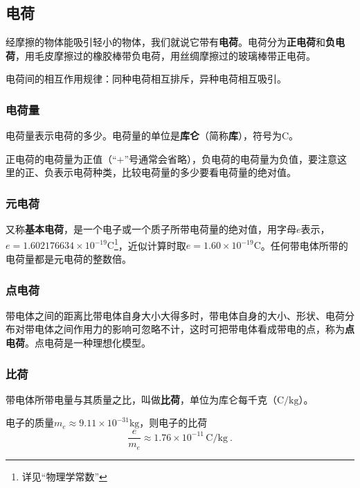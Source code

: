 
\subsection{电荷}

经摩擦的物体能吸引轻小的物体，我们就说它带有\textbf{电荷}。电荷分为\textbf{正电荷}和\textbf{负电荷}，用毛皮摩擦过的橡胶棒带负电荷，用丝绸摩擦过的玻璃棒带正电荷。

电荷间的相互作用规律：同种电荷相互排斥，异种电荷相互吸引。

\subsubsection{电荷量}

电荷量表示电荷的多少。电荷量的单位是\textbf{库仑}（简称\textbf{库}），符号为$\mathrm{C}$。

正电荷的电荷量为正值（“$+$”号通常会省略），负电荷的电荷量为负值，要注意这里的正、负表示电荷种类，比较电荷量的多少要看电荷量的绝对值。

\subsubsection{元电荷}

又称\textbf{基本电荷}，是一个电子或一个质子所带电荷量的绝对值，用字母$e$表示，$e = 1.602176634 \times 10^{-19} \mathrm{C}$\footnote{详见“物理学常数”}，近似计算时取$e = 1.60 \times 10^{-19} \mathrm{C}$。任何带电体所带的电荷量都是元电荷的整数倍。

\subsubsection{点电荷}

带电体之间的距离比带电体自身大小大得多时，带电体自身的大小、形状、电荷分布对带电体之间作用力的影响可忽略不计，这时可把带电体看成带电的点，称为\textbf{点电荷}。点电荷是一种理想化模型。

\subsubsection{比荷}

带电体所带电量与其质量之比，叫做\textbf{比荷}，单位为库仑每千克（$\mathrm{C/kg}$）。

电子的质量$m_e \approx 9.11 \times 10^{-31} \mathrm{kg}$，则电子的比荷
\begin{equation}
\frac{e}{m_e} \approx 1.76 \times 10^{-11} \,\mathrm{C/kg}~.
\end{equation}

